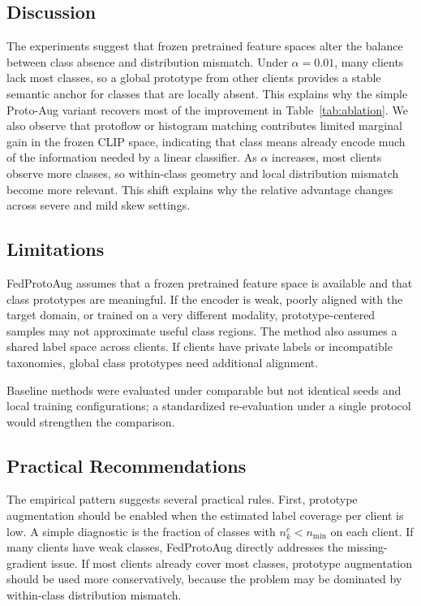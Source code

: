 ﻿\documentclass[conference]{IEEEtran}
\newcommand{\method}{FedProtoAug}
\newcommand{\clip}{CLIP}
\begin{document}
\subsection{Discussion}
The experiments suggest that frozen pretrained feature spaces alter the balance between class absence and distribution mismatch. Under $\alpha = 0.01$, many clients lack most classes, so a global prototype from other clients provides a stable semantic anchor for classes that are locally absent. This explains why the simple Proto-Aug variant recovers most of the improvement in Table~\ref{tab:ablation}. We also observe that protoflow or histogram matching contributes limited marginal gain in the frozen \clip{} space, indicating that class means already encode much of the information needed by a linear classifier. As $\alpha$ increases, most clients observe more classes, so within-class geometry and local distribution mismatch become more relevant. This shift explains why the relative advantage changes across severe and mild skew settings.

\subsection{Limitations}
\method{} assumes that a frozen pretrained feature space is available and that class prototypes are meaningful. If the encoder is weak, poorly aligned with the target domain, or trained on a very different modality, prototype-centered samples may not approximate useful class regions. The method also assumes a shared label space across clients. If clients have private labels or incompatible taxonomies, global class prototypes need additional alignment.

Baseline methods were evaluated under comparable but not identical seeds and local training configurations; a standardized re-evaluation under a single protocol would strengthen the comparison.

\subsection{Practical Recommendations}
The empirical pattern suggests several practical rules. First, prototype augmentation should be enabled when the estimated label coverage per client is low. A simple diagnostic is the fraction of classes with $n_k^c<n_{\min}$ on each client. If many clients have weak classes, \method{} directly addresses the missing-gradient issue. If most clients already cover most classes, prototype augmentation should be used more conservatively, because the problem may be dominated by within-class distribution mismatch.
\end{document}
